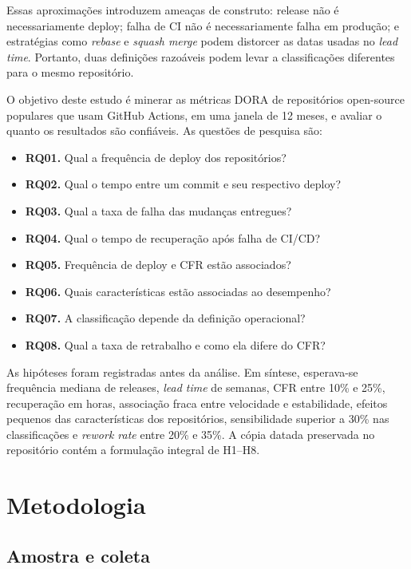 \documentclass[12pt]{article}
\begin{document}
Essas aproximações introduzem ameaças de construto: release não é
necessariamente deploy; falha de CI não é necessariamente falha em produção;
e estratégias como \textit{rebase} e \textit{squash merge} podem distorcer as
datas usadas no \textit{lead time}. Portanto, duas definições razoáveis podem
levar a classificações diferentes para o mesmo repositório.

O objetivo deste estudo é minerar as métricas DORA de repositórios
open-source populares que usam GitHub Actions, em uma janela de 12 meses, e
avaliar o quanto os resultados são confiáveis. As questões de pesquisa são:

\begin{itemize}
  \item \textbf{RQ01.} Qual a frequência de deploy dos repositórios?
  \item \textbf{RQ02.} Qual o tempo entre um commit e seu respectivo deploy?
  \item \textbf{RQ03.} Qual a taxa de falha das mudanças entregues?
  \item \textbf{RQ04.} Qual o tempo de recuperação após falha de CI/CD?
  \item \textbf{RQ05.} Frequência de deploy e CFR estão associados?
  \item \textbf{RQ06.} Quais características estão associadas ao desempenho?
  \item \textbf{RQ07.} A classificação depende da definição operacional?
  \item \textbf{RQ08.} Qual a taxa de retrabalho e como ela difere do CFR?
\end{itemize}

As hipóteses foram registradas antes da análise. Em síntese, esperava-se
frequência mediana de releases, \textit{lead time} de semanas, CFR entre 10\%
e 25\%, recuperação em horas, associação fraca entre velocidade e
estabilidade, efeitos pequenos das características dos repositórios,
sensibilidade superior a 30\% nas classificações e \textit{rework rate} entre
20\% e 35\%. A cópia datada preservada no repositório contém a formulação
integral de H1--H8.

\section{Metodologia}

\subsection{Amostra e coleta}
\end{document}
